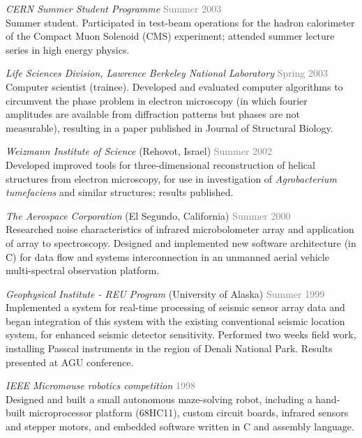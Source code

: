 \documentclass[margin,line]{res}
\begin{document}
\begin{resume}

\emph{CERN Summer Student Programme} \hfill {\textcolor{gray}{Summer 2003}} \\
Summer student.  Participated in test-beam operations for the hadron
calorimeter of the Compact Muon Solenoid (CMS) experiment; attended
summer lecture series in high energy physics.

\emph{Life Sciences Division, Lawrence Berkeley National Laboratory} \hfill {\textcolor{gray}{Spring 2003}} \\
Computer scientist (trainee). Developed and evaluated computer algorithms to circumvent the phase problem in
electron microscopy (in which fourier amplitudes are available from
diffraction patterns but phases are not measurable), resulting in a
paper published in Journal of Structural Biology.

\emph{Weizmann Institute of Science} (Rehovot, Israel) \hfill {\textcolor{gray}{Summer 2002}} \\
Developed improved tools for three-dimensional reconstruction of
helical structures from electron microscopy, for use in investigation
of \emph{Agrobacterium tumefaciens} and similar structures; results
published.

\emph{The Aerospace Corporation} (El Segundo, California) \hfill {\textcolor{gray}{Summer 2000}} \\
Researched noise characteristics of infrared microbolometer array and
application of array to spectroscopy. Designed and implemented new
software architecture (in C) for data flow and systems interconnection in
an unmanned aerial vehicle multi-spectral observation platform.


\emph{Geophysical Institute - REU Program} (University of Alaska) \hfill {\textcolor{gray}{Summer 1999}} \\
Implemented a system for real-time processing of seismic sensor array data
and began integration of this system with the existing conventional
seismic location system, for enhanced seismic detector sensitivity.
Performed two weeks field work, installing Passcal instruments in the
region of Denali National Park. Results presented at AGU conference.

\emph{IEEE Micromouse robotics competition} \hfill {\textcolor{gray}{1998}} \\
Designed and built a small autonomous maze-solving robot, including a hand-built microprocessor platform (68HC11),
custom circuit boards, infrared sensors and stepper motors, and embedded software written in C and assembly language.  


\end{resume}
\end{document}
